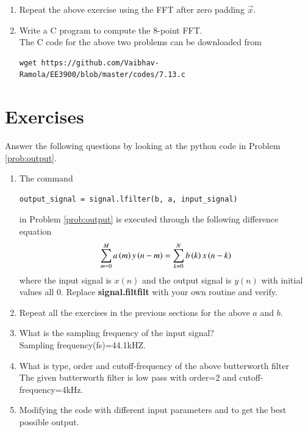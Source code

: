 \documentclass[journal,12pt,twocolumn]{IEEEtran}
\renewcommand\thesection{\arabic{section}}
\begin{document}
\begin{enumerate}[label=\thesection.\arabic*]
\item Repeat the above exercise using the FFT
after zero padding $\vec{x}$.
\item Write a C program to compute the 8-point FFT. \\
\solution The C code for the above two problems can be downloaded from
\begin{lstlisting}
wget https://github.com/Vaibhav-Ramola/EE3900/blob/master/codes/7.13.c
\end{lstlisting}
\end{enumerate}
\section{Exercises}
Answer the following questions by looking at the python code in Problem \ref{prob:output}.
\begin{enumerate}[label=\thesection.\arabic*]
\item
The command
\begin{lstlisting}
output_signal = signal.lfilter(b, a, input_signal)
\end{lstlisting}
in Problem \ref{prob:output} is executed through the following difference equation
\begin{equation}
	\label{eq:iir_filter_gen}
	\sum _{m=0}^{M}a\left(m\right)y\left(n-m\right)=\sum _{k=0}^{N}b\left(k\right)x\left(n-k\right)
\end{equation}
%
where the input signal is $x(n)$ and the output signal is $y(n)$ with initial values all 0. Replace
\textbf{signal.filtfilt} with your own routine and verify.
%
\item Repeat all the exercises in the previous sections for the above $a$ and $b$.

\item What is the sampling frequency of the input signal?
\\
\solution
Sampling frequency(fs)=44.1kHZ.
\item
What is type, order and  cutoff-frequency of the above butterworth filter
\\
\solution
The given butterworth filter is low pass with order=2 and cutoff-frequency=4kHz.
%
\item
Modifying the code with different input parameters and to get the best possible output.

\end{enumerate}
\end{document}
